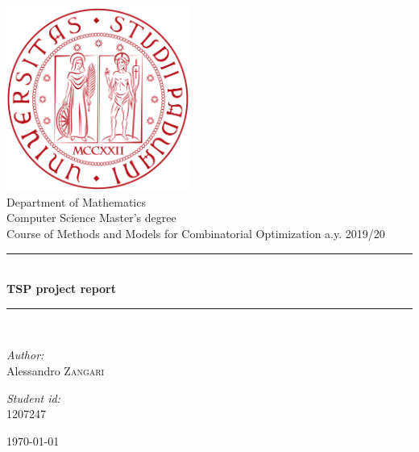 \documentclass[a4paper,12pt]{article}
\begin{document}

\begin{titlepage}
\thispagestyle{empty}
\begin{center}
	

\includegraphics[width=0.45\textwidth]{logo-unipd}\\[1cm]

{\large Department of Mathematics}\\[0.5cm]

{\large Computer Science Master's degree}\\[0.5cm]

{\large Course of Methods and Models for Combinatorial Optimization a.y. 2019/20}\\[0.5cm]


\rule{\linewidth}{0.5mm} \\[0.4cm]
{ \huge \bfseries TSP project report \\[0.4cm] }
\rule{\linewidth}{0.5mm} \\[1.5cm]

\noindent
\begin{minipage}{0.4\textwidth}
  \begin{flushleft} \large
    \emph{Author:}\\
    Alessandro \textsc{Zangari}
  \end{flushleft}
\end{minipage}%
\begin{minipage}{0.4\textwidth}
  \begin{flushright} \large
    \emph{Student id:} \\
    \textsc{1207247}
  \end{flushright}
\end{minipage}

\vfill

{\today}

\end{center}
\end{titlepage}
\end{document}
